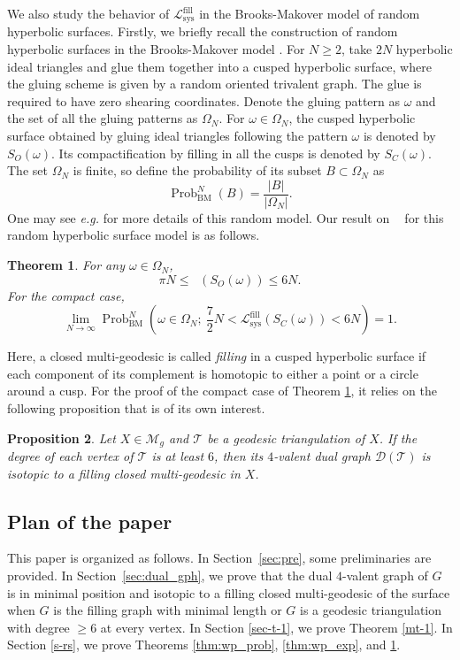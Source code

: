 \documentclass[UTF8]{amsart}
\newtheorem{theorem}{Theorem}[section]
\newtheorem{proposition}[theorem]{Proposition}
\numberwithin{equation}{section}
\theoremstyle{definition}
\theoremstyle{example}
\theoremstyle{remark}
\DeclareMathOperator{\sys}{sys}
\DeclareMathOperator{\prob}{Prob}
\DeclareMathOperator{\slfs}{\mathcal{L}_{sys}^{fill}}
\begin{document}
We also study the behavior of $\mathcal{L}_{\sys}^{\mathrm{fill}}$ in the Brooks-Makover model \cite{brooks2004random} of random hyperbolic surfaces. Firstly, we briefly recall the construction of random hyperbolic surfaces in the Brooks-Makover model \cite{brooks2004random}. For $N\geq 2$, take $2N$ hyperbolic ideal triangles and glue them together into a cusped hyperbolic surface, where the gluing scheme is given by a random oriented trivalent graph. The glue is required to have zero shearing coordinates. Denote the gluing pattern as $\omega$ and the set of all the gluing patterns as $\Omega_{N}$. For $\omega\in \Omega_N$, the cusped hyperbolic surface obtained by gluing ideal triangles following the pattern $\omega$ is denoted by $S_O(\omega)$. Its compactification by filling in all the cusps is denoted by $S_C(\omega)$. The set $\Omega_N$ is finite, so define the probability of its subset $B\subset \Omega_N$ as 
\[
	\prob_{\mathrm{BM}}^N(B) = \frac{|B|}{|\Omega_N|}. 
\]
One may see \emph{e.g.} \cite{gamburd2006poisson, petri2015random, budzinski2021diameter, SW23, liu2023random} for more details of this random model. Our result on $\slfs$ for this random hyperbolic surface model is as follows.
\begin{theorem}\label{mt-3}
	For any $\omega \in \Omega_N$, 
	\[
	  \pi N \le  \slfs (S_O(\omega)) \le 6N. 
	\]
For the compact case,
\[\lim\limits_{N\to \infty}\prob_{\mathrm{BM}}^N \left( \omega\in \Omega_N; \ \frac{7}{2}N <  \mathcal{L}^{\mathrm{fill}}_{\mathrm{sys}} (S_C(\omega)) < 6N \right) = 1.\]
\end{theorem}
\noindent Here, a closed multi-geodesic is called \emph{filling} in a cusped hyperbolic surface if each component of its complement is homotopic to either a point or a circle around a cusp. For the proof of the compact case of Theorem \ref{mt-3}, it relies on the following proposition that is of its own interest.   
\setcounter{section}{3}
\setcounter{theorem}{13}
\begin{proposition}
	Let $X \in \mathcal{M}_g$ and $\mathcal{T}$ be a geodesic triangulation of $X$. If the degree of each vertex of $\mathcal{T}$ is at least $6$, then its $4$-valent dual graph $\mathcal{D}(\mathcal{T})$ is isotopic to a filling closed multi-geodesic in $X$.  
	\label{prop:ess_tri_mid_gph_intro}
\end{proposition}
\setcounter{section}{1}
\setcounter{theorem}{5}


\subsection*{Plan of the paper}
This paper is organized as follows. In Section~\ref{sec:pre}, some preliminaries are provided. 
In Section~\ref{sec:dual_gph}, we prove that the dual $4$-valent graph of $G$ is in minimal position and isotopic to a filling closed multi-geodesic of the surface when $G$ is the filling graph with minimal length or $G$ is a geodesic triangulation with degree $ \ge 6$ at every vertex. In Section \ref{sec-t-1}, we prove Theorem \ref{mt-1}. In Section \ref{s-rs}, we prove Theorems \ref{thm:wp_prob}, \ref{thm:wp_exp}, and \ref{mt-3}. 
\end{document}
